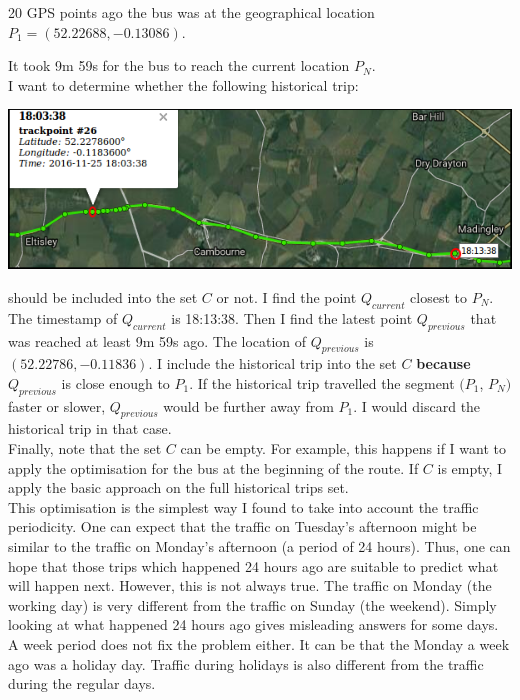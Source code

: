 \documentclass[12pt,a4paper,oneside,openright]{report}
\begin{document}
20 GPS points ago the bus was at the geographical location $P_1 = (52.22688, -0.13086)$.

It took 9m 59s for the bus to reach the current location $P_N$. \\

I want to determine whether the following historical trip:

\includegraphics[width=\textwidth]{figs/optimisation_match2.png}

should be included into the set $C$ or not. I find the point $Q_{current}$ closest to
$P_N$. The timestamp of $Q_{current}$ is 18:13:38. Then I find the latest point $Q_{previous}$
that was reached at least 9m 59s ago. The location of $Q_{previous}$ is $(52.22786, -0.11836)$.
I include the historical trip into the set $C$ \textbf{because} $Q_{previous}$ is close enough
to $P_1$. If the historical trip travelled the segment $(P_1$, $P_N)$ faster or slower,
$Q_{previous}$ would be further away from $P_1$. I would discard the historical trip in that case. \\

Finally, note that the set $C$ can be empty. For example, this happens if I want to apply the optimisation
for the bus at the beginning of the route. If $C$ is empty, I apply the basic approach on the full historical trips set. \\

This optimisation is the simplest way I found to take into account the traffic
periodicity. One can expect that the traffic on Tuesday's afternoon might be similar to the
traffic on Monday's afternoon (a period of 24 hours). Thus, one can hope that those trips which
happened 24 hours ago are suitable to predict what will happen next. However,
this is not always true. The traffic on Monday (the working day) is very different
from the traffic on Sunday (the weekend). Simply looking at what happened 24 hours ago gives
misleading answers for some days. A week period does not fix the problem either.
It can be that the Monday a week ago was a holiday day.
Traffic during holidays is also different from the traffic during the regular days. \\
\end{document}
